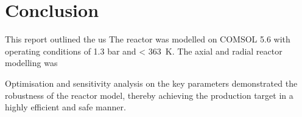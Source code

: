 \section{Conclusion} \label{sec:conclusion}
This report outlined the us
The reactor was modelled on COMSOL 5.6 with operating conditions of 1.3 bar and \SI{< 363}{\K}.
The axial and radial reactor modelling was 

Optimisation and sensitivity analysis on the key parameters demonstrated the robustness of the reactor model, thereby achieving the production target in a highly efficient and safe manner. 
